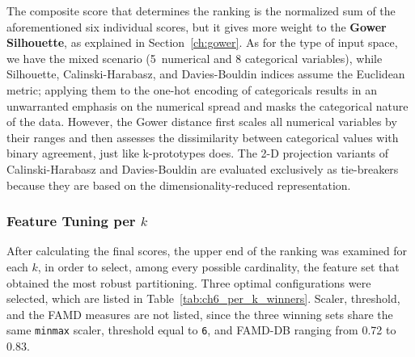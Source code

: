 The composite score that determines the ranking is the normalized sum of the aforementioned six individual scores, but it gives more weight to the \textbf{Gower Silhouette}, as explained in Section~\ref{ch:gower}. As for the type of input space, we have the mixed scenario (5~numerical and 8 categorical variables), while Silhouette, Calinski-Harabasz, and Davies-Bouldin indices assume the Euclidean metric; applying them to the one-hot encoding of categoricals results in an unwarranted emphasis on the numerical spread and masks the categorical nature of the data. However, the Gower distance first scales all numerical variables by their ranges and then assesses the dissimilarity between categorical values with binary agreement, just like k-prototypes does. The 2-D projection variants of Calinski-Harabasz and Davies-Bouldin are evaluated exclusively as tie-breakers because they are based on the dimensionality-reduced representation.

\subsubsection*{Feature Tuning per $k$}

After calculating the final scores, the upper end of the ranking was examined for each $k$, in order to select, among every possible cardinality, the feature set that obtained the most robust partitioning. Three optimal configurations were selected, which are listed in Table~\ref{tab:ch6_per_k_winners}. Scaler, threshold, and the FAMD measures are not listed, since the three winning sets share the same \texttt{minmax} scaler, threshold equal to \texttt{6}, and FAMD-DB ranging from 0.72 to 0.83.


